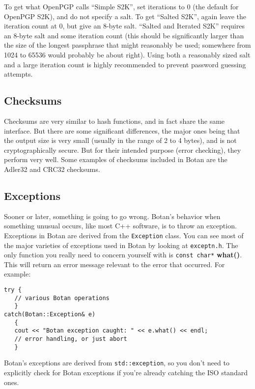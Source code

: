 \documentclass{article}
\newcommand{\filename}[1]{\texttt{#1}}
\newcommand{\function}[1]{\textbf{#1}}
\newcommand{\type}[1]{\texttt{#1}}
\begin{document}
To get what OpenPGP calls ``Simple S2K'', set iterations to 0 (the default for
OpenPGP S2K), and do not specify a salt. To get ``Salted S2K'', again leave the
iteration count at 0, but give an 8-byte salt. ``Salted and Iterated S2K''
requires an 8-byte salt and some iteration count (this should be significantly
larger than the size of the longest passphrase that might reasonably be used;
somewhere from 1024 to 65536 would probably be about right). Using both a
reasonably sized salt and a large iteration count is highly recommended to
prevent password guessing attempts.

\subsection{Checksums}

Checksums are very similar to hash functions, and in fact share the same
interface. But there are some significant differences, the major ones being
that the output size is very small (usually in the range of 2 to 4 bytes), and
is not cryptographically secure. But for their intended purpose (error
checking), they perform very well. Some examples of checksums included in Botan
are the Adler32 and CRC32 checksums.

\subsection{Exceptions}

Sooner or later, something is going to go wrong. Botan's behavior when
something unusual occurs, like most C++ software, is to throw an exception.
Exceptions in Botan are derived from the \type{Exception} class. You can see
most of the major varieties of exceptions used in Botan by looking at
\filename{exceptn.h}. The only function you really need to concern yourself
with is \type{const char*} \function{what()}. This will return an error message
relevant to the error that occurred. For example:

\begin{verbatim}
try {
   // various Botan operations
   }
catch(Botan::Exception& e)
   {
   cout << "Botan exception caught: " << e.what() << endl;
   // error handling, or just abort
   }
\end{verbatim}

Botan's exceptions are derived from \type{std::exception}, so you don't need
to explicitly check for Botan exceptions if you're already catching the ISO
standard ones.
\end{document}

